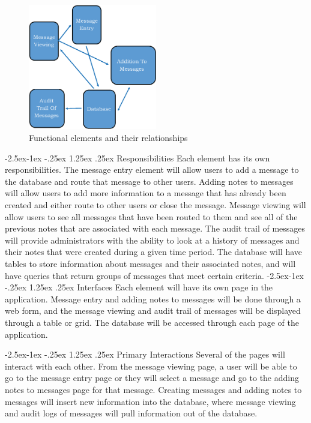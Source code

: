 \documentclass[onecolumn, draftclsnofoot,10pt, compsoc]{IEEEtran}
\makeatletter
\renewcommand\paragraph{\@startsection{paragraph}{4}{\z@}%
            {-2.5ex\@plus -1ex \@minus -.25ex}%
            {1.25ex \@plus .25ex}%
            {\normalfont\normalsize\bfseries}}
\makeatother
\begin{document}
\begin{figure}[h!]
  \includegraphics[width=0.5\textwidth]{functional_elements}
  \caption{Functional elements and their relationships}
\end{figure}

\paragraph{Responsibilities}
Each element has its own responsibilities. The message entry element will allow users to add a message to the database and route that message to other users. Adding notes to messages will allow users to add more information to a message that has already been created and either route to other users or close the message. Message viewing will allow users to see all messages that have been routed to them and see all of the previous notes that are associated with each message. The audit trail of messages will provide administrators with the ability to look at a history of messages and their notes that were created during a given time period. The database will have tables to store information about messages and their associated notes, and will have queries that return groups of messages that meet certain criteria.
\paragraph{Interfaces}
Each element will have its own page in the application. Message entry and adding notes to messages will be done through a web form, and the message viewing and audit trail of messages will be displayed through a table or grid. The database will be accessed through each page of the application. 

\paragraph{Primary Interactions}
Several of the pages will interact with each other. From the message viewing page, a user will be able to go to the message entry page or they will select a message and go to the adding notes to messages page for that message. Creating messages and adding notes to messages will insert new information into the database, where message viewing and audit logs of messages will pull information out of the database.
\end{document}
